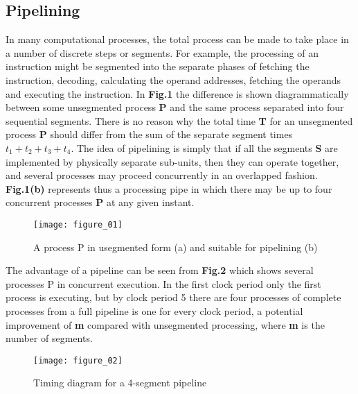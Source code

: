 \documentclass[a4paper,12pt]{article}
\begin{document}
\subsection{Pipelining}
   In many computational processes, the total process can be made to
   take place in a number of discrete steps or segments. For example,
   the processing of an instruction might be segmented into the
   separate phases of fetching the instruction, decoding, calculating
   the operand addresses, fetching the operands and executing the
   instruction. In {\bfseries Fig.1} the difference is shown
   diagrammatically between some unsegmented process {\bfseries P} and
   the same process separated into four sequential segments. There is
   no reason why the total time {\bfseries T} for an unsegmented
   process {\bfseries P} should differ from the sum of the separate
   segment times $t_1 + t_2 + t_3 + t_4$. The idea of pipelining
   is simply that if all the segments {\bfseries S} are implemented by
   physically separate sub-units, then they can operate together, and
   several processes may proceed concurrently in an overlapped
   fashion. {\bfseries Fig.1(b)} represents thus a processing pipe in
   which there may be up to four concurrent processes {\bfseries P} at
   any given instant.

\begin{figure}[h]
  \centering
  \texttt{[image: figure\_01]}
  \caption{A process P in usegmented form (a) and suitable for
    pipelining (b)}
\end{figure}

   The advantage of a pipeline can be seen from \textbf{Fig.2} which
shows several processes P in concurrent execution. In the first
clock period only the first process is executing, but by clock
period 5 there are four processes of complete processes from a full
pipeline is one for every clock period, a potential improvement of
\textbf{m} compared with unsegmented processing, where \textbf{m} is the number of segments.
   
\begin{figure}[h]
  \centering
  \texttt{[image: figure\_02]}
  \caption{Timing diagram for a 4-segment pipeline}
\end{figure}
\end{document}
